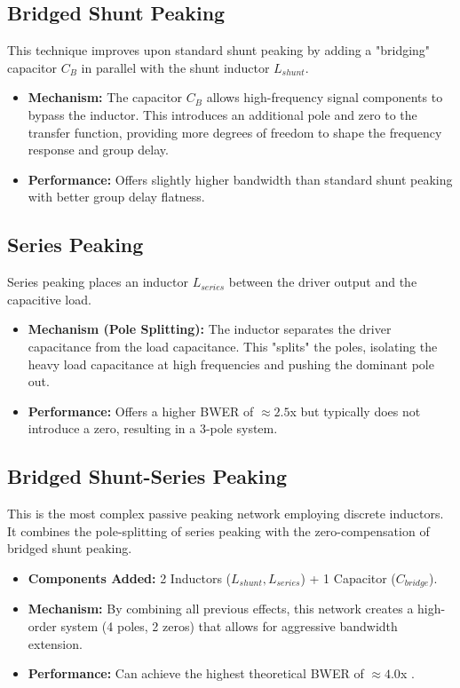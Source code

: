 \subsection{Bridged Shunt Peaking}
This technique improves upon standard shunt peaking by adding a "bridging" capacitor $C_B$ in parallel with the shunt inductor $L_{shunt}$.
\begin{itemize}
    \item \textbf{Mechanism:} The capacitor $C_B$ allows high-frequency signal components to bypass the inductor. This introduces an additional pole and zero to the transfer function, providing more degrees of freedom to shape the frequency response and group delay.
    \item \textbf{Performance:} Offers slightly higher bandwidth than standard shunt peaking with better group delay flatness.
\end{itemize}

\subsection{Series Peaking}
Series peaking places an inductor $L_{series}$ between the driver output and the capacitive load.
\begin{itemize}
    \item \textbf{Mechanism (Pole Splitting):} The inductor separates the driver capacitance from the load capacitance. This "splits" the poles, isolating the heavy load capacitance at high frequencies and pushing the dominant pole out.
    \item \textbf{Performance:} Offers a higher BWER of $\approx 2.5$x but typically does not introduce a zero, resulting in a 3-pole system.
\end{itemize}

\subsection{Bridged Shunt-Series Peaking}
This is the most complex passive peaking network employing discrete inductors. It combines the pole-splitting of series peaking with the zero-compensation of bridged shunt peaking.
\begin{itemize}
    \item \textbf{Components Added:} 2 Inductors ($L_{shunt}, L_{series}$) + 1 Capacitor ($C_{bridge}$).
    \item \textbf{Mechanism:} By combining all previous effects, this network creates a high-order system (4 poles, 2 zeros) that allows for aggressive bandwidth extension.
    \item \textbf{Performance:} Can achieve the highest theoretical BWER of $\approx 4.0$x \cite{shekhar}.
\end{itemize}

